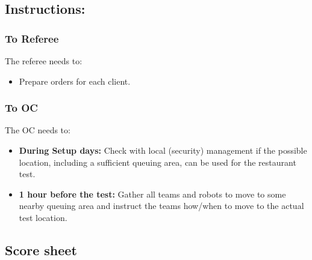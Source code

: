 \subsection*{Instructions:}

\subsubsection*{To Referee}

The referee needs to:
\begin{itemize}
	\item Prepare orders for each client.
\end{itemize}

\subsubsection*{To OC}
The OC needs to:
\begin{itemize}[nosep]
	\item \textbf{During Setup days:} Check with local (security) management if the possible location, including a sufficient queuing area, can be used for the restaurant test.
	\item \textbf{1 hour before the test:} Gather all teams and robots to move to some nearby queuing area and instruct the teams how/when to move to the actual test location.
\end{itemize}

\newpage
\subsection*{Score sheet}


\cleardoublepage




